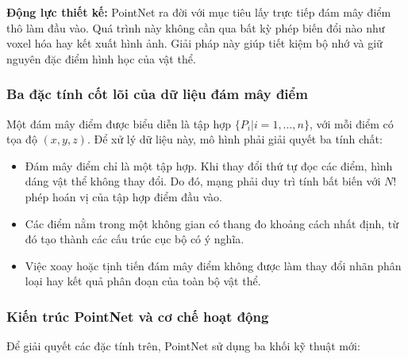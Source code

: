 \textbf{Động lực thiết kế:} PointNet ra đời với mục tiêu lấy trực tiếp đám mây điểm thô làm đầu vào. Quá trình này không cần qua bất kỳ phép biến đổi nào như voxel hóa hay kết xuất hình ảnh.
 Giải pháp này giúp tiết kiệm bộ nhớ và giữ nguyên đặc điểm hình học của vật thể.

\subsubsection{Ba đặc tính cốt lõi của dữ liệu đám mây điểm}

Một đám mây điểm được biểu diễn là tập hợp $\{P_i | i=1,...,n\}$, với mỗi điểm có tọa độ $(x, y, z)$. Để xử lý dữ liệu này, mô hình phải giải quyết ba tính chất:

\begin{itemize}
    \item Đám mây điểm chỉ là một tập hợp. Khi thay đổi thứ tự đọc các điểm, hình dáng vật thể không thay đổi. Do đó, mạng phải duy trì tính bất biến với $N!$ phép hoán vị của tập hợp điểm đầu vào.
    \item Các điểm nằm trong một không gian có thang đo khoảng cách nhất định, từ đó tạo thành các cấu trúc cục bộ có ý nghĩa.
    \item Việc xoay hoặc tịnh tiến đám mây điểm không được làm thay đổi nhãn phân loại hay kết quả phân đoạn của toàn bộ vật thể.
\end{itemize}

\subsubsection{Kiến trúc PointNet và cơ chế hoạt động}

Để giải quyết các đặc tính trên, PointNet sử dụng ba khối kỹ thuật mới:


